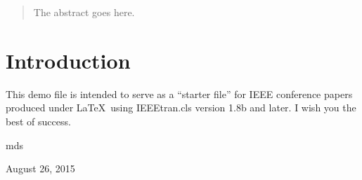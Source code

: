 \documentclass[conference]{IEEEtran}
\begin{document}
	
	
	
	
	
	
	
	\maketitle
	
	\begin{abstract}
		The abstract goes here.
	\end{abstract}
	
	
	
	
	
	\IEEEpeerreviewmaketitle
	
	
	
	\section{Introduction}
	This demo file is intended to serve as a ``starter file''
	for IEEE conference papers produced under \LaTeX\ using
	IEEEtran.cls version 1.8b and later.
	I wish you the best of success.
	
	\hfill mds
	
	\hfill August 26, 2015

	
	
	
\end{document}
